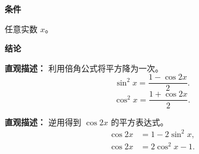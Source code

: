 \begin{statementbox}

	\textbf{\textcolor{CStatement}{条件}}
	\begin{description}[style=nextline, leftmargin=2.8em, labelsep=0.5em, itemsep=0.35em]
		\item[\textbf{\textcolor{CStatement}{条件1（自变量范围）：}}] 任意实数 $x$。
	\end{description}

	\textbf{\textcolor{CStatement}{结论}}
	\begin{description}[style=nextline, leftmargin=2.8em, labelsep=0.5em, itemsep=0.45em]
		\item[\textbf{\textcolor{CStatement}{结论一（降幂公式）：}}]
			\textbf{\textcolor{CStatement}{直观描述：}}
			利用倍角公式将平方降为一次。
			\[
				\sin^2 x = \frac{1-\cos 2x}{2}.
			\]
			\[
				\cos^2 x = \frac{1+\cos 2x}{2}.
			\]

		\item[\textbf{\textcolor{CStatement}{推广结论（升幂公式）：}}]
			\textbf{\textcolor{CStatement}{直观描述：}}
			逆用得到 $\cos 2x$ 的平方表达式。
			\[
				\begin{aligned}
					\cos 2x &= 1-2\sin^2 x,\\
					\cos 2x &= 2\cos^2 x-1.
			\end{aligned}
			\]
	\end{description}
\end{statementbox}
